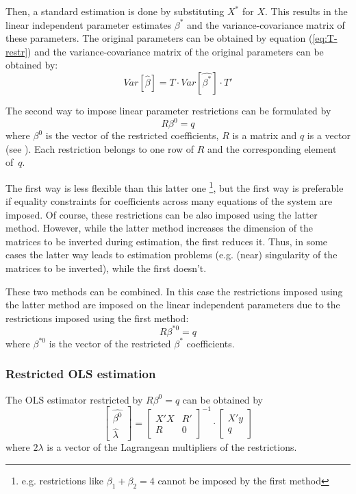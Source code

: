 \documentclass[article]{jss}
\begin{document}
Then, a standard estimation is done by substituting $X^*$ for $X$.
This results in the linear independent parameter estimates $\beta^*$ and
the variance-covariance matrix of these parameters. 
The original parameters can be obtained by equation (\ref{eq:T-restr})
and the variance-covariance matrix of the original parameters 
can be obtained by:
\begin{equation}
   Var \left[ \widehat{\beta} \right] = T \cdot Var \left[ \widehat{\beta^*} \right] \cdot T'
\end{equation}

The second way to impose linear parameter restrictions 
can be formulated by
\begin{equation}
   R \beta^0 = q
\end{equation}
where $\beta^0$ is the vector of the restricted coefficients, 
$R$ is a matrix and $q$ is a vector (see \citealp[p. 100]{greene02}). 
Each restriction belongs to one row of $R$ and the corresponding 
element of~$q$.

The first way is less flexible than this latter one%
\footnote{e.g. restrictions like $\beta_1 + \beta_2 = 4$ cannot be imposed
by the first method}, 
but the first way is preferable if equality constraints for coefficients
across many equations of the system are imposed. 
Of course, these restrictions can be also imposed using
the latter method.
However, while the latter method increases the dimension of the 
matrices to be inverted during estimation, the first reduces it. 
Thus, in some cases the latter way leads to estimation problems
(e.g. (near) singularity of the matrices to be inverted),
while the first doesn't.

These two methods can be combined. In this case the restrictions
imposed using the latter method are imposed on the linear independent 
parameters due to the restrictions imposed using the first method:
\begin{equation}
   R \beta^{*0} = q
\end{equation}
where $\beta^{*0}$ is the vector of the restricted $\beta^*$ coefficients.

\subsubsection{Restricted OLS estimation}

The OLS estimator restricted by $R \beta^0 = q$ can be obtained by
\begin{equation}
   \left[ \begin{array}{c}
      \widehat{\beta^0} \\ \widehat{\lambda}
   \end{array} \right]
   =
   \left[ \begin{array}{cc}
      X' X & R' \\ 
      R & 0
   \end{array} \right]^{-1}
   \cdot
   \left[ \begin{array}{c}
      X' y \\ q 
   \end{array} \right]
\end{equation}
where $2\lambda$ is a vector of the Lagrangean multipliers of the restrictions.
\end{document}
